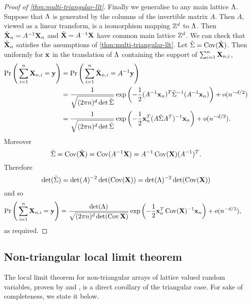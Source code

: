 \begin{proof}[Proof of \cref{thm:multi-triangular-llt}]
    Finally we generalise to any main lattice $\Lambda$. Suppose that $\Lambda$ is generated by the columns of the invertible matrix $A$. Then $A$, viewed as a linear transform, is a isomorphism mapping ${\mathbb Z}^d$ to $\Lambda$. 
    Then $\tilde{{\mathbf X}}_n = A^{-1} {\mathbf X}_n$ and $\tilde{{\mathbf X}} = A^{-1} {\mathbf X}$ have common main lattice ${\mathbb Z}^d$. We can check that $\tilde{{\mathbf X}}_n$ satisfies the assumptions of \cref{thm:multi-triangular-llt}. Let $\tilde{\Sigma} = \operatorname{Cov}(\tilde{{\mathbf X}})$. Then uniformly for ${\mathbf x}$ in the translation of $\Lambda$ containing the support of $\sum_{i=1}^n {\mathbf X}_{n, i}$,
    \begin{align*}
        \Pr\Bigg(\sum_{i=1}^n {\mathbf X}_{n, i} = {\mathbf y}\Bigg)
        &= \Pr\Bigg(\sum_{i=1}^n \tilde{{\mathbf X}}_{n, i} = A^{-1}{\mathbf y}\Bigg) \\
        &= \frac{1}{\sqrt{(2 \pi n)^{d} \det\tilde{\Sigma}}} \exp \left( 
            -\frac{1}{2} (A^{-1} {\mathbf x}_n)^T \tilde{\Sigma}^{-1} (A^{-1} {\mathbf x}_n) 
         \right) + o(n^{-d/2}) \\
        &= \frac{1}{\sqrt{(2 \pi n)^{d} \det\tilde{\Sigma}}} \exp \left( 
            -\frac{1}{2} {\mathbf x}_n^T (A \tilde{\Sigma} A^T)^{-1} {\mathbf x}_n 
         \right) + o(n^{-d/2}).
    \end{align*}
    Moreover
    \begin{equation*}
        \tilde{\Sigma}
        = \operatorname{Cov}(\tilde{{\mathbf X}}) = \operatorname{Cov}(A^{-1} {\mathbf X})
        = A^{-1} \operatorname{Cov}({\mathbf X}) (A^{-1})^T.
    \end{equation*}
    Therefore
    \begin{equation*}
        \det(\tilde{\Sigma}) = \det(A)^{-2} \det(\operatorname{Cov}({\mathbf X})) = \det(\Lambda)^{-2} \det(\operatorname{Cov}({\mathbf X}))
    \end{equation*}
    and so
    \begin{align*}
        \Pr\Bigg(\sum_{i=1}^n {\mathbf X}_{n, i} = {\mathbf y}\Bigg)
        &= \frac{\det(\Lambda)}{\sqrt{(2 \pi n)^{d} \det(\operatorname{Cov} {\mathbf X})}} \exp \left( 
            -\frac{1}{2} {\mathbf x}_n^T \operatorname{Cov}({\mathbf X})^{-1} {\mathbf x}_n 
         \right) + o(n^{-d/2}),
    \end{align*}
    as required.
\end{proof}

\subsection{Non-triangular local limit theorem}

The local limit theorem for non-triangular arrays of lattice valued random variables, proven by \citet{rvavceva1962domains} and \citet{gamkrelidzeLocalLimitTheorem2015}, is a direct corollary of the triangular case. For sake of completeness, we state it below.

